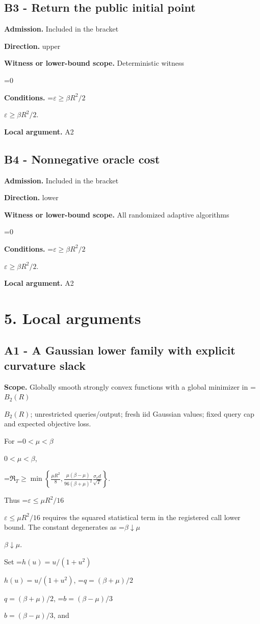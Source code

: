 \documentclass[10pt,a4paper]{article}
\newcommand{\AtlasMath}[1]{\par\begingroup\centering\setbox0=\hbox{$\displaystyle #1$}\ifdim\wd0>1.4\linewidth\typeout{ATLAS WIDE FORMULA: \the\wd0}\fi\ifdim\wd0>\linewidth\resizebox{\linewidth}{!}{\box0}\else\box0\fi\par\endgroup}
\newcommand{\AtlasInlineMath}[1]{\begingroup\setbox0=\hbox{$#1$}\ifdim\wd0>.4\linewidth\endgroup\AtlasMath{#1}\else\endgroup$#1$\fi}
\begin{document}
\subsection{B3 - Return the public initial point}
\textbf{Admission.} Included in the bracket

\textbf{Direction.} upper

\textbf{Witness or lower-bound scope.} Deterministic witness

\AtlasMath{0}
\textbf{Conditions.} \AtlasInlineMath{\varepsilon\ge \beta R^2/2}.

\textbf{Local argument.} A2

\subsection{B4 - Nonnegative oracle cost}
\textbf{Admission.} Included in the bracket

\textbf{Direction.} lower

\textbf{Witness or lower-bound scope.} All randomized adaptive algorithms

\AtlasMath{0}
\textbf{Conditions.} \AtlasInlineMath{\varepsilon\ge \beta R^2/2}.

\textbf{Local argument.} A2

\section{5. Local arguments}
\subsection{A1 - A Gaussian lower family with explicit curvature slack}
\textbf{Scope.} Globally smooth strongly convex functions with a global minimizer in \AtlasInlineMath{B_2(R)}; unrestricted queries/output; fresh iid Gaussian values; fixed query cap and expected objective loss.

For \AtlasInlineMath{0<\mu<\beta},

\AtlasMath{\mathfrak R_T\ge\min\left\{\frac{\mu R^2}{8},\frac{\mu(\beta-\mu)}{96(\beta+\mu)^2}\frac{\sigma_v d}{\sqrt T}\right\}.}

Thus \AtlasInlineMath{\varepsilon\le\mu R^2/16} requires the squared statistical term in the registered call lower bound. The constant degenerates as \AtlasInlineMath{\beta\downarrow\mu}.

Set \AtlasInlineMath{h(u)=u/(1+u^2)}, \AtlasInlineMath{q=(\beta+\mu)/2}, \AtlasInlineMath{b=(\beta-\mu)/3}, and
\end{document}
